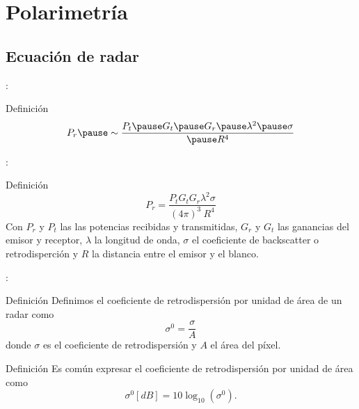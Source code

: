 \section{Polarimetría}

\subsection{Ecuación de radar}

\begin{frame}{\secname : \subsecname}
    \begin{block}{Definición}
      \begin{equation}
        P_r \pause \sim \frac{ P_t \pause G_t \pause G_r \pause \lambda^2 \pause \sigma}{\pause R^4}
      \end{equation}
    \end{block}
\end{frame}

\begin{frame}{\secname : \subsecname}
    \begin{block}{Definición}
      \begin{equation}
        P_r = \frac{ P_t  G_t  G_r  \lambda^2  \sigma}{ (4\pi)^3 \ R^4}
      \end{equation}
      Con $P_r$ y $P_t$ las las potencias recibidas y transmitidas, $G_r$ y $G_t$ las ganancias del emisor y receptor, $\lambda$ la longitud de onda, $\sigma$ el coeficiente de backscatter o retrodisperción y $R$ la distancia entre el emisor y el blanco.
    \end{block}
\end{frame}

\begin{frame}{\secname : \subsecname}

  \begin{block}{Definición}
    Definimos el coeficiente de retrodispersión por unidad de área de un radar como
    \begin{equation}
      \sigma^0 = \frac{\sigma}{A}
    \end{equation}
    donde $\sigma$ es el coeficiente de retrodispersión y $A$ el área del píxel.
  \end{block}
  \pause
    \begin{block}{Definición}
      Es común expresar el coeficiente de retrodispersión por unidad de área como
      \begin{equation}
        \sigma^0 [dB] = 10\log_{10}(\sigma^0).
      \end{equation}
    \end{block}
\end{frame}

